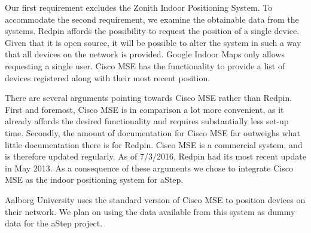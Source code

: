Our first requirement excludes the Zonith Indoor Positioning System. To accommodate the second requirement, we examine the obtainable data from the systems. Redpin affords the possibility to request the position of a single device. Given that it is open source, it will be possible to alter the system in such a way that all devices on the network is provided. Google Indoor Maps only allows requesting a single user. Cisco MSE has the functionality to provide a list of devices registered along with their most recent position.

There are several arguments pointing towards Cisco MSE rather than Redpin. First and foremost, Cisco MSE is in comparison a lot more convenient, as it already affords the desired functionality and requires substantially less set-up time. Secondly, the amount of documentation for Cisco MSE far outweighs what little documentation there is for Redpin. Cisco MSE is a commercial system, and is therefore updated regularly. As of 7/3/2016, Redpin had its most recent update in May 2013. As a consequence of these arguments we chose to integrate Cisco MSE as the indoor positioning system for aStep.

Aalborg University uses the standard version of Cisco MSE to position devices on their network. We plan on using the data available from this system as dummy data for the aStep project.